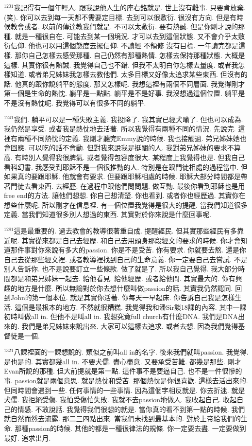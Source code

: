 \documentclass{book}
\begin{document}
$^{1201}$我記得有一個年輕人.
跟我說他人生的座右銘就是.
世上沒有難事.
只要肯放棄.
(笑).
你可以去到每一天都不需要定目標.
去到可以很敷衍.
很沒有方向.
但是有時候教會或者.
以前的傳達教我們就是.
不可以太敷衍.
要有熱誠.
但是你剛才說的那種.
就是一種很自在.
可能去到某一個境況.
才可以去到這個狀態.
又不會介乎太敷衍信仰.
他也可以用這個態度去擺信仰.
不讀經 不領修 沒有目標.
一年讀完都是這樣.
那你自己怎樣去感受那種.
自己仍然有那種熱情.
怎樣去保持那種狀態.
大概是這樣.
其實你很有熱誠.
我覺得自己也不錯.
但我不太明白你怎樣去量度.
或者我怎樣知道.
或者弟兄姊妹我怎樣去教他們.
太多目標又好像太追求某些東西.
但沒有的話.
他真的跟你說躺平的態度.
那又怎樣呢.
我想這裡有兩個不同層面.
我覺得剛才第一個是生命的熱忱.
躺平是一點點.
躺平是不是好事.
我沒想過這個位置.
躺平是不是沒有熱忱呢.
我覺得可以有很多不同的躺平.

$^{1241}$我們.
躺平可以是一種失敗主義.
我投降了.
我其實已經犬喻了.
但也可以成為.
我仍然是享受.
或者我是熱忱地去活著.
所以我覺得有兩種不同的情況.
先說完.
這裡有兩種不同熱忱的定義.
我剛才聽完Emmy說的時候.
我也接觸過.
弟兄姊妹她也會回應.
可以吃的話不會動.
但對我來說我是挺闊的人.
我對弟兄姊妹的要求不算高.
有時別人覺得我很脾氣.
或者覺得包容度很大.
某程度上我覺得也是.
但我自己看科幻書.
我感受到耶穌不是一個很推動的人.
特別是在跟門徒相處的過程當中.
但如果真的要跟耶穌.
他就會有要求.
但要跟耶穌相處的時候.
耶穌大部分時間都是帶著門徒去看東西.
去經歷.
在過程中跟他們問問題.
做互動.
最後你看到耶穌也是用free end的方法.
讓他們想想.
你自己想清楚.
你也看到.
或者你也經歷過.
其實你在想些什麼呢.
所以剛才在信息裡.
有一個位置我覺得是很大的提醒.
當我們知道很多定義.
當我們知道很多別人想過的東西.
其實對於你來說是什麼回事呢.

$^{1281}$這是最重要的.
過去教會的教導很著重自成.
提醒經民.
但其實那些經民有多靠近呢.
其實從來都是自己去經歷.
和自己去用頭身那段經文的要求的時候.
你才會知道那件事對你來說有多大的passion.
你是不是受苦.
你有要求.
你就要去熬.
還是你自己去從那些經文裡.
或者教導裡找到自己的生命意義.
你一定要自己去嘗試.
不是別人告訴你.
也不是說要訂立一些條款.
做了就是了.
所以我自己覺得.
我大部分時間都是和弟兄姊妹一起去.
給他看見.
給他經歷.
或者給他問.
其實最大的.
你有興趣的地方是什麼.
所以無論對於你去想什麼叫做passion的話.
其實我仍然認同.
回到John的第一個本位.
就是其實你活著.
你每天一早起床.
你告訴自己我是怎樣生活.
這個是最根本的地方.
不然就很糟糕.
我覺得我和潘Sir談18課的內容.
其中一課初時叫做all in.
但他不是叫all in.
我想究竟full church有什麼DNA.
我們是DNA出來的.
我們是弟兄姊妹來說出來.
大家可以這樣去追求.
或者去想.
因為我們覺得基督徒是一個.

$^{1321}$八課裡面的一課想說的.
類似之前叫all in的名字.
後來我們就叫passion.
我覺得.
是也是的.
其實都幾all in.
不要犬儒.
盡心盡意.
又要承受苦難.
都幾是那些.
剛才Evan所說的那種.
但大前提就是第一點.
這件事不是要逼自己.
也不是一件很慘的事.
passion就是兩個意思.
就是熱忱和受苦.
那個熱忱是你很喜歡.
這樣去活出來的.
但同時間會遇到一些.
任何事情的一些事情.
因為這個字相反就是.
你去折迷.
就是犬儒.
我拒絕受傷.
我怕受傷怕失敗.
我就不去passion地做人.
我收起自己.
收起自己的情感.
不敢說話.
我覺得我們很想的就是.
當你真的看不到第一點的時候.
我們就自然而然去流露.
那二三四點出來.
當我們未找到最基本的.
對於上帝給我們的生命.
那種passion的時候.
其他的都是一種很律法的規條.
你一定要去盡.
一定要做到最好.
追求出月.
\end{document}
